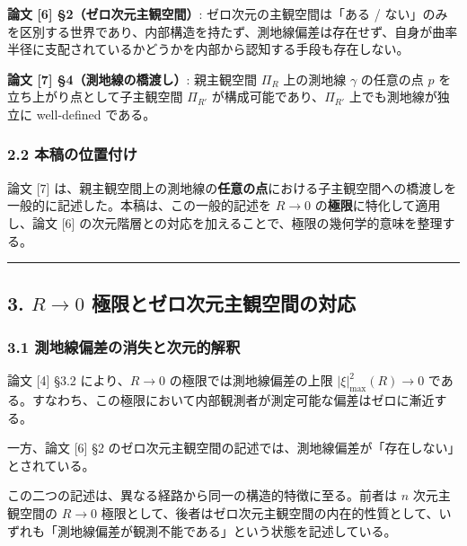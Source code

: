 \documentclass[a4paper,11pt]{ltjsarticle}
\theoremstyle{definition}
\begin{document}
\textbf{論文 {[}6{]} §2（ゼロ次元主観空間）}: ゼロ次元の主観空間は「ある
/
ない」のみを区別する世界であり、内部構造を持たず、測地線偏差は存在せず、自身が曲率半径に支配されているかどうかを内部から認知する手段も存在しない。

\textbf{論文 {[}7{]} §4（測地線の橋渡し）}: 親主観空間 \(\Pi_R\)
上の測地線 \(\gamma\) の任意の点 \(p\) を立ち上がり点として子主観空間
\(\Pi_{R'}\) が構成可能であり、\(\Pi_{R'}\) 上でも測地線が独立に
well-defined である。

\subsubsection{2.2
本稿の位置付け}\label{ux672cux7a3fux306eux4f4dux7f6eux4ed8ux3051}

論文 {[}7{]}
は、親主観空間上の測地線の\textbf{任意の点}における子主観空間への橋渡しを一般的に記述した。本稿は、この一般的記述を
\(R \to 0\) の\textbf{極限}に特化して適用し、論文 {[}6{]}
の次元階層との対応を加えることで、極限の幾何学的意味を整理する。

\begin{center}\rule{0.5\linewidth}{0.5pt}\end{center}

\subsection{\texorpdfstring{3. \(R \to 0\)
極限とゼロ次元主観空間の対応}{3. R \textbackslash to 0 極限とゼロ次元主観空間の対応}}\label{r-to-0-ux6975ux9650ux3068ux30bcux30edux6b21ux5143ux4e3bux89b3ux7a7aux9593ux306eux5bfeux5fdc}

\subsubsection{3.1
測地線偏差の消失と次元的解釈}\label{ux6e2cux5730ux7ddaux504fux5deeux306eux6d88ux5931ux3068ux6b21ux5143ux7684ux89e3ux91c8}

論文 {[}4{]} §3.2 により、\(R \to 0\) の極限では測地線偏差の上限
\(|\xi|^2_{\max}(R) \to 0\)
である。すなわち、この極限において内部観測者が測定可能な偏差はゼロに漸近する。

一方、論文 {[}6{]} §2
のゼロ次元主観空間の記述では、測地線偏差が「存在しない」とされている。

この二つの記述は、異なる経路から同一の構造的特徴に至る。前者は \(n\)
次元主観空間の \(R \to 0\)
極限として、後者はゼロ次元主観空間の内在的性質として、いずれも「測地線偏差が観測不能である」という状態を記述している。
\end{document}
